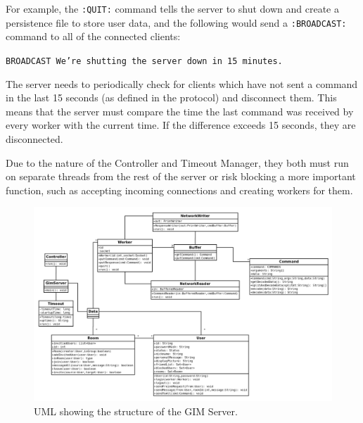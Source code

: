 For example, the \texttt{:QUIT:} command tells the server to shut down and create a persistence file to store user data, and the following would send a \texttt{:BROADCAST:} command to all of the connected clients:

\texttt{BROADCAST We're shutting the server down in 15 minutes.}

The server needs to periodically check for clients which have not sent a command in the last 15 seconds (as defined in the protocol) and disconnect them. This means that the server must compare the time the last command was received by every worker with the current time. If the difference exceeds 15 seconds, they are disconnected.

Due to the nature of the Controller and Timeout Manager, they both must run on separate threads from the rest of the server or risk blocking a more important function, such as accepting incoming connections and creating workers for them.

\begin{landscape}
    \begin{figure}
        \begin{center}
            \includegraphics[scale=0.5]{Design/diagrams/server_uml.png}
            \caption{UML showing the structure of the GIM Server.}
            \label{umlDia}
        \end{center}
    \end{figure}
\end{landscape}
